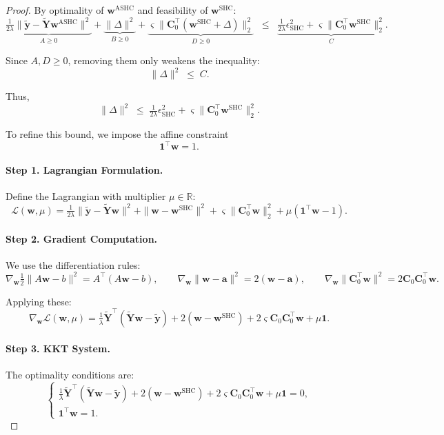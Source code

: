 \documentclass{article}
\begin{document}
\begin{proof}
By optimality of $\mathbf{w}^{\text{ASHC}}$ and feasibility of $\mathbf{w}^{\text{SHC}}$:
\[
\underbrace{\tfrac{1}{2\lambda}\|\widetilde{\mathbf{y}} - \widetilde{\mathbf{Y}}\mathbf{w}^{\text{ASHC}}\|^2}_{A \geq 0}
+ \underbrace{\|\Delta\|^2}_{B \geq 0}
+ \underbrace{\varsigma\|\mathbf{C}_0^\top(\mathbf{w}^{\text{SHC}}+\Delta)\|_2^2}_{D \geq 0}
\;\;\leq\;\;
\underbrace{\tfrac{1}{2\lambda}\epsilon_{\text{SHC}}^2 
+ \varsigma \|\mathbf{C}_0^\top \mathbf{w}^{\text{SHC}}\|_2^2}_{C}.
\]

Since $A,D \geq 0$, removing them only weakens the inequality:
\[
\|\Delta\|^2 \;\leq\; C.
\]

Thus,
\[
\|\Delta\|^2 \;\leq\; \tfrac{1}{2\lambda}\epsilon_{\text{SHC}}^2 
+ \varsigma\|\mathbf{C}_0^\top \mathbf{w}^{\text{SHC}}\|_2^2.
\]

\medskip
\noindent
To refine this bound, we impose the affine constraint 
\[
\mathbf{1}^\top \mathbf{w} = 1.
\]

\paragraph{Step 1. Lagrangian Formulation.}
Define the Lagrangian with multiplier $\mu \in \mathbb{R}$:
\[
\mathcal{L}(\mathbf{w},\mu)
= \tfrac{1}{2\lambda}\|\widetilde{\mathbf{y}} - \widetilde{\mathbf{Y}}\mathbf{w}\|^2
+ \|\mathbf{w}-\mathbf{w}^{\text{SHC}}\|^2
+ \varsigma\|\mathbf{C}_0^\top\mathbf{w}\|_2^2
+ \mu(\mathbf{1}^\top \mathbf{w} - 1).
\]

\paragraph{Step 2. Gradient Computation.}
We use the differentiation rules:
\[
\nabla_{\mathbf{w}} \tfrac{1}{2}\|A\mathbf{w}-b\|^2 = A^\top(A\mathbf{w}-b), \qquad
\nabla_{\mathbf{w}}\|\mathbf{w}-\mathbf{a}\|^2 = 2(\mathbf{w}-\mathbf{a}), \qquad
\nabla_{\mathbf{w}}\|\mathbf{C}_0^\top\mathbf{w}\|^2 = 2\mathbf{C}_0\mathbf{C}_0^\top\mathbf{w}.
\]

Applying these:
\[
\nabla_{\mathbf{w}}\mathcal{L}(\mathbf{w},\mu) 
= \tfrac{1}{\lambda}\widetilde{\mathbf{Y}}^\top(\widetilde{\mathbf{Y}}\mathbf{w}-\widetilde{\mathbf{y}})
+ 2(\mathbf{w}-\mathbf{w}^{\text{SHC}})
+ 2\varsigma\mathbf{C}_0\mathbf{C}_0^\top\mathbf{w}
+ \mu \mathbf{1}.
\]

\paragraph{Step 3. KKT System.}
The optimality conditions are:
\[
\begin{cases}
\tfrac{1}{\lambda}\widetilde{\mathbf{Y}}^\top(\widetilde{\mathbf{Y}}\mathbf{w}-\widetilde{\mathbf{y}})
+ 2(\mathbf{w}-\mathbf{w}^{\text{SHC}})
+ 2\varsigma\mathbf{C}_0\mathbf{C}_0^\top\mathbf{w}
+ \mu \mathbf{1} = 0, \\
\mathbf{1}^\top\mathbf{w} = 1.
\end{cases}
\]


\end{proof}
\end{document}
